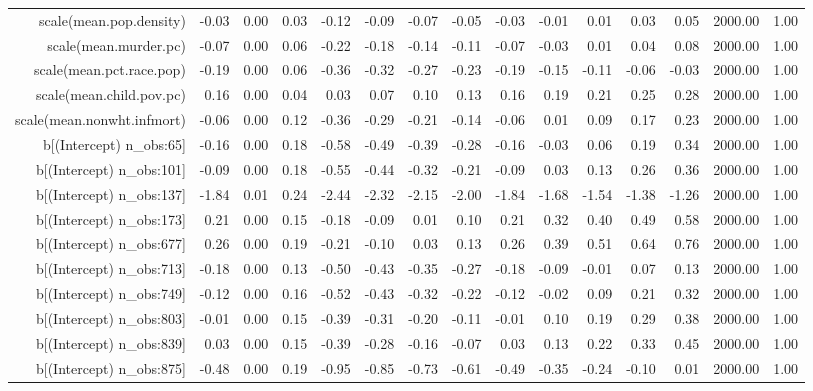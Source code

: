 \begin{table}[ht]
\begin{tabular}{rrrrrrrrrrrrrrr}
  scale(mean.pop.density) & -0.03 & 0.00 & 0.03 & -0.12 & -0.09 & -0.07 & -0.05 & -0.03 & -0.01 & 0.01 & 0.03 & 0.05 & 2000.00 & 1.00 \\ 
  scale(mean.murder.pc) & -0.07 & 0.00 & 0.06 & -0.22 & -0.18 & -0.14 & -0.11 & -0.07 & -0.03 & 0.01 & 0.04 & 0.08 & 2000.00 & 1.00 \\ 
  scale(mean.pct.race.pop) & -0.19 & 0.00 & 0.06 & -0.36 & -0.32 & -0.27 & -0.23 & -0.19 & -0.15 & -0.11 & -0.06 & -0.03 & 2000.00 & 1.00 \\ 
  scale(mean.child.pov.pc) & 0.16 & 0.00 & 0.04 & 0.03 & 0.07 & 0.10 & 0.13 & 0.16 & 0.19 & 0.21 & 0.25 & 0.28 & 2000.00 & 1.00 \\ 
  scale(mean.nonwht.infmort) & -0.06 & 0.00 & 0.12 & -0.36 & -0.29 & -0.21 & -0.14 & -0.06 & 0.01 & 0.09 & 0.17 & 0.23 & 2000.00 & 1.00 \\ 
  b[(Intercept) n\_obs:65] & -0.16 & 0.00 & 0.18 & -0.58 & -0.49 & -0.39 & -0.28 & -0.16 & -0.03 & 0.06 & 0.19 & 0.34 & 2000.00 & 1.00 \\ 
  b[(Intercept) n\_obs:101] & -0.09 & 0.00 & 0.18 & -0.55 & -0.44 & -0.32 & -0.21 & -0.09 & 0.03 & 0.13 & 0.26 & 0.36 & 2000.00 & 1.00 \\ 
  b[(Intercept) n\_obs:137] & -1.84 & 0.01 & 0.24 & -2.44 & -2.32 & -2.15 & -2.00 & -1.84 & -1.68 & -1.54 & -1.38 & -1.26 & 2000.00 & 1.00 \\ 
  b[(Intercept) n\_obs:173] & 0.21 & 0.00 & 0.15 & -0.18 & -0.09 & 0.01 & 0.10 & 0.21 & 0.32 & 0.40 & 0.49 & 0.58 & 2000.00 & 1.00 \\ 
  b[(Intercept) n\_obs:677] & 0.26 & 0.00 & 0.19 & -0.21 & -0.10 & 0.03 & 0.13 & 0.26 & 0.39 & 0.51 & 0.64 & 0.76 & 2000.00 & 1.00 \\ 
  b[(Intercept) n\_obs:713] & -0.18 & 0.00 & 0.13 & -0.50 & -0.43 & -0.35 & -0.27 & -0.18 & -0.09 & -0.01 & 0.07 & 0.13 & 2000.00 & 1.00 \\ 
  b[(Intercept) n\_obs:749] & -0.12 & 0.00 & 0.16 & -0.52 & -0.43 & -0.32 & -0.22 & -0.12 & -0.02 & 0.09 & 0.21 & 0.32 & 2000.00 & 1.00 \\ 
  b[(Intercept) n\_obs:803] & -0.01 & 0.00 & 0.15 & -0.39 & -0.31 & -0.20 & -0.11 & -0.01 & 0.10 & 0.19 & 0.29 & 0.38 & 2000.00 & 1.00 \\ 
  b[(Intercept) n\_obs:839] & 0.03 & 0.00 & 0.15 & -0.39 & -0.28 & -0.16 & -0.07 & 0.03 & 0.13 & 0.22 & 0.33 & 0.45 & 2000.00 & 1.00 \\ 
  b[(Intercept) n\_obs:875] & -0.48 & 0.00 & 0.19 & -0.95 & -0.85 & -0.73 & -0.61 & -0.49 & -0.35 & -0.24 & -0.10 & 0.01 & 2000.00 & 1.00 \\ 

\end{tabular}
\end{table}
